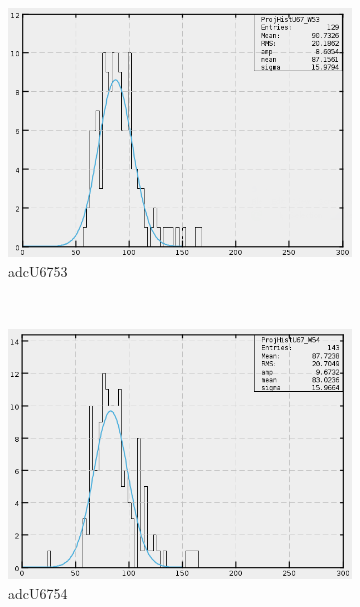 \begin{figure}[h]
\begin{subfigure}[h]{0.3\textwidth}
        \includegraphics[width=\textwidth, keepaspectratio = true]{adcU67_53}
        \caption{adcU6753}
        \label{fig:adcU67_53}
    \end{subfigure}
    ~
    \begin{subfigure}[h]{0.3\textwidth}
        \centering
        \includegraphics[width=\textwidth, keepaspectratio = true]{adcU67_54}
        \caption{adcU6754}
        \label{fig:adcU67_54}
    \end{subfigure}
    ~
    \begin{subfigure}[h]{0.3\textwidth}
        \centering

\end{subfigure}
\end{figure}
